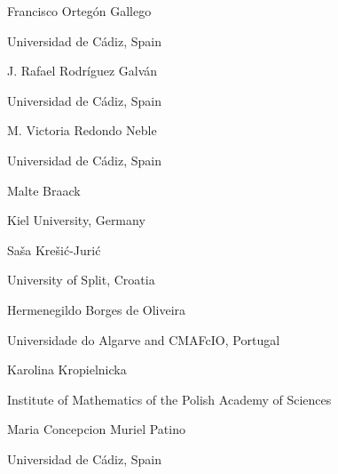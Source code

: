 \documentclass[
]{article}
\begin{document}
\hfill\break


Francisco Ortegón Gallego

Universidad de Cádiz, Spain


J. Rafael Rodríguez Galván

Universidad de Cádiz, Spain


M. Victoria Redondo Neble

Universidad de Cádiz, Spain


Malte Braack

Kiel University, Germany

\hfill\break


Saša Krešić-Jurić

University of Split, Croatia


Hermenegildo Borges de Oliveira

Universidade do Algarve and CMAFcIO, Portugal


Karolina Kropielnicka

Institute of Mathematics of the Polish Academy of Sciences


Maria Concepcion Muriel Patino

Universidad de Cádiz, Spain

\hfill\break

~

\end{document}
